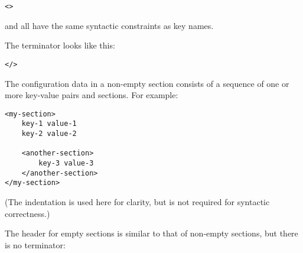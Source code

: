 \documentclass{howto}
\begin{document}
\begin{alltt}
<  >
\end{alltt}

 and  %
all have the same syntactic constraints as key names.

The terminator looks like this:

\begin{alltt}
</>
\end{alltt}

The configuration data in a non-empty section consists of a sequence
of one or more key-value pairs and sections.  For example:

\begin{verbatim}
<my-section>
    key-1 value-1
    key-2 value-2

    <another-section>
        key-3 value-3
    </another-section>
</my-section>
\end{verbatim}

(The indentation is used here for clarity, but is not required for
syntactic correctness.)





The header for empty sections is similar to that of non-empty
sections, but there is no terminator:
\end{document}
